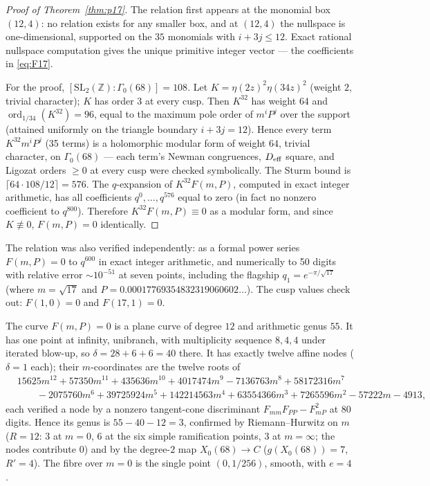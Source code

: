 \documentclass[11pt]{amsart}
\theoremstyle{plain}
\theoremstyle{definition}
\theoremstyle{remark}
\newcommand{\Z}{\mathbb{Z}}
\begin{document}
\begin{proof}[Proof of Theorem~\ref{thm:p17}]
The relation first appears at the monomial box $(12,4)$: no relation exists
for any smaller box, and at $(12,4)$ the nullspace is one-dimensional,
supported on the $35$ monomials with $i + 3j \leq 12$. Exact rational
nullspace computation gives the unique primitive integer vector --- the
coefficients in \eqref{eq:F17}.

For the proof, $[\mathrm{SL}_2(\Z):\Gamma_0(68)] = 108$. Let
$K = \eta(2z)^2\eta(34z)^2$ (weight $2$, trivial character); $K$ has order $3$
at every cusp. Then $K^{32}$ has weight $64$ and
$\operatorname{ord}_{1/34}(K^{32}) = 96$, equal to the maximum pole order of
$m^iP^j$ over the support (attained uniformly on the triangle boundary
$i + 3j = 12$). Hence every term $K^{32}m^iP^j$ (35 terms) is a holomorphic
modular form of weight $64$, trivial character, on $\Gamma_0(68)$ --- each
term's Newman congruences, $D_{\rm eff}$ square, and Ligozat orders $\geq 0$
at every cusp were checked symbolically. The Sturm bound is
$\lceil 64\cdot 108/12\rceil = 576$. The $q$-expansion of $K^{32}F(m,P)$,
computed in exact integer arithmetic, has all coefficients $q^0,\dots,q^{576}$
equal to zero (in fact no nonzero coefficient to $q^{800}$). Therefore
$K^{32}F(m,P) \equiv 0$ as a modular form, and since $K \not\equiv 0$,
$F(m,P) = 0$ identically.
\end{proof}

The relation was also verified independently: as a formal power series
$F(m,P) = 0$ to $q^{600}$ in exact integer arithmetic, and numerically to 50
digits with relative error $\sim 10^{-51}$ at seven points, including the
flagship $q_1 = e^{-\pi/\sqrt{17}}$ (where $m = \sqrt{17}$ and
$P = 0.00017769354832319060602\dots$). The cusp values check out:
$F(1,0) = 0$ and $F(17,1) = 0$.

The curve $F(m,P) = 0$ is a plane curve of degree $12$ and arithmetic genus
$55$. It has one point at infinity, unibranch, with multiplicity sequence
$8, 4, 4$ under iterated blow-up, so $\delta = 28 + 6 + 6 = 40$ there. It has
exactly twelve affine nodes ($\delta = 1$ each); their $m$-coordinates are the
twelve roots of
\begin{align}
&15625m^{12} + 57350m^{11} + 435636m^{10} + 4017474m^9 - 7136763m^8
+ 58172316m^7 \nonumber \\
&\qquad - 2075760m^6 + 39725924m^5 + 142214563m^4
+ 63554366m^3 + 7265596m^2 - 57222m - 4913,
\end{align}
each verified a node by a nonzero tangent-cone discriminant
$F_{mm}F_{PP} - F_{mP}^2$ at 80 digits. Hence its genus is $55 - 40 - 12 = 3$,
confirmed by Riemann--Hurwitz on $m$ ($R = 12$: $3$ at $m = 0$, $6$ at the six
simple ramification points, $3$ at $m = \infty$; the nodes contribute $0$) and
by the degree-$2$ map $X_0(68) \to C$ ($g(X_0(68)) = 7$, $R' = 4$). The fibre
over $m = 0$ is the single point $(0,1/256)$, smooth, with $e = 4$.
\end{document}
